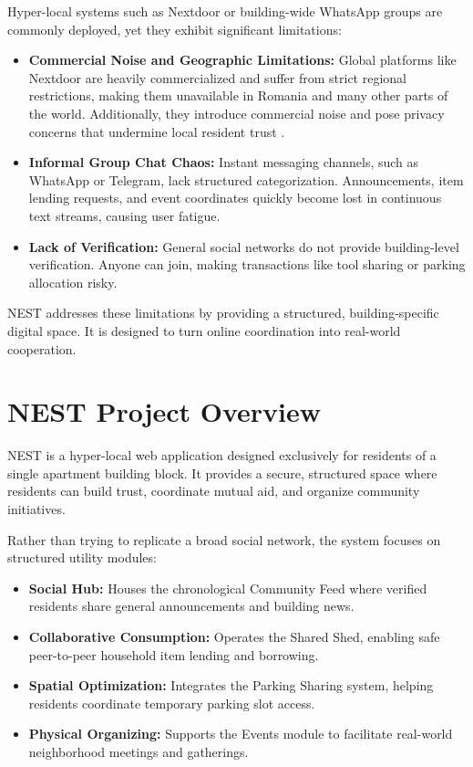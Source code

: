 Hyper-local systems such as Nextdoor \cite{nextdoor2024} or building-wide WhatsApp groups are commonly deployed, yet they exhibit significant limitations:
\begin{itemize}
    \item \textbf{Commercial Noise and Geographic Limitations:} Global platforms like Nextdoor are heavily commercialized and suffer from strict regional restrictions, making them unavailable in Romania and many other parts of the world. Additionally, they introduce commercial noise and pose privacy concerns that undermine local resident trust \cite{masden2014tensions}.
    \item \textbf{Informal Group Chat Chaos:} Instant messaging channels, such as WhatsApp or Telegram, lack structured categorization. Announcements, item lending requests, and event coordinates quickly become lost in continuous text streams, causing user fatigue.
    \item \textbf{Lack of Verification:} General social networks do not provide building-level verification. Anyone can join, making transactions like tool sharing or parking allocation risky.
\end{itemize}

NEST addresses these limitations by providing a structured, building-specific digital space. It is designed to turn online coordination into real-world cooperation.

\section{NEST Project Overview}
NEST is a hyper-local web application designed exclusively for residents of a single apartment building block. It provides a secure, structured space where residents can build trust, coordinate mutual aid, and organize community initiatives.

Rather than trying to replicate a broad social network, the system focuses on structured utility modules:
\begin{itemize}
    \item \textbf{Social Hub:} Houses the chronological Community Feed where verified residents share general announcements and building news.
    \item \textbf{Collaborative Consumption:} Operates the Shared Shed, enabling safe peer-to-peer household item lending and borrowing.
    \item \textbf{Spatial Optimization:} Integrates the Parking Sharing system, helping residents coordinate temporary parking slot access.
    \item \textbf{Physical Organizing:} Supports the Events module to facilitate real-world neighborhood meetings and gatherings.
\end{itemize}

